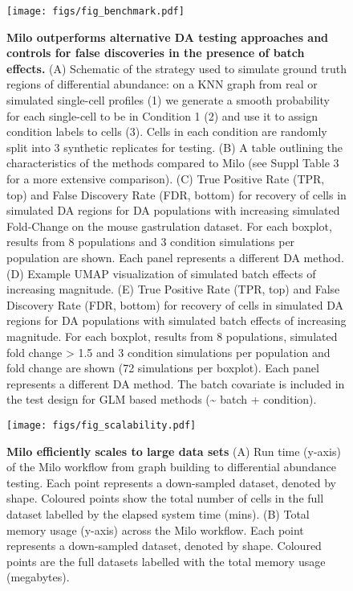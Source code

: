\documentclass[
  10pt,
]{article}
\begin{document}
\begin{figure}
\centering
\texttt{[image: figs/fig\_benchmark.pdf]}
\caption{\label{fig:fig-2}\textbf{Milo outperforms alternative DA testing approaches and controls for false discoveries in the presence of batch effects.} (A) Schematic of the strategy used to simulate ground truth regions of differential abundance: on a KNN graph from real or simulated single-cell profiles (1) we generate a smooth probability for each single-cell to be in Condition 1 (2) and use it to assign condition labels to cells (3). Cells in each condition are randomly split into 3 synthetic replicates for testing.
(B) A table outlining the characteristics of the methods compared to Milo (see Suppl Table 3 for a more extensive comparison).
(C) True Positive Rate (TPR, top) and False Discovery Rate (FDR, bottom) for recovery of cells in simulated DA regions for DA populations with increasing simulated Fold-Change on the mouse gastrulation dataset. For each boxplot, results from 8 populations and 3 condition simulations per population are shown. Each panel represents a different DA method. (D) Example UMAP visualization of simulated batch effects of increasing magnitude.
(E) True Positive Rate (TPR, top) and False Discovery Rate (FDR, bottom) for recovery of cells in simulated DA regions for DA populations with simulated batch effects of increasing magnitude. For each boxplot, results from 8 populations, simulated fold change \textgreater{} 1.5 and 3 condition simulations per population and fold change are shown (72 simulations per boxplot). Each panel represents a different DA method. The batch covariate is included in the test design for GLM based methods (\textasciitilde{} batch + condition).}
\end{figure}






\begin{figure}
\centering
\texttt{[image: figs/fig\_scalability.pdf]}
\caption{\label{fig:fig-3}\textbf{Milo efficiently scales to large data sets}
(A) Run time (y-axis) of the Milo workflow from graph building to differential abundance testing. Each point represents a down-sampled dataset, denoted by shape. Coloured points show the total number of cells in the full dataset labelled by the elapsed system time (mins).
(B) Total memory usage (y-axis) across the Milo workflow. Each point represents a down-sampled dataset, denoted by shape. Coloured points are the full datasets labelled with the total memory usage (megabytes).}
\end{figure}
\end{document}
